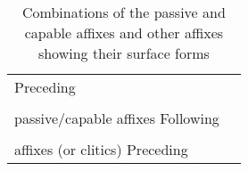 \begin{table}
\caption{\label{tab:key:65} Combinations of the passive and capable affixes and other affixes showing their surface forms}

\begin{tabular}{ll}
\lsptoprule
Preceding                                                                                                                                                                                                                                                                                                                                                                                                                                                                                                                       \\
                                                                                                                                                                                                                                                                                                                                                                                                                                                                                                                                \\
passive/capable affixes  Following                                                                                                                                                                                                                                                                                                                                                                                                                                                                                              \\
                                                                                                                                                                                                                                                                                                                                                                                                                                                                                                                                \\
affixes (or clitics)    Preceding                                                                                                                                                                                                                                                                                                                                                                                                                                                                                               \\

\end{tabular}
\end{table}
